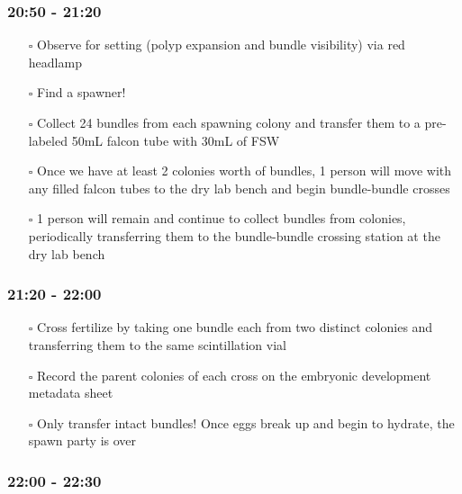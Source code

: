 \documentclass[
  letterpaper,
  DIV=11,
  numbers=noendperiod]{scrartcl}
\providecommand{\tightlist}{%
  \setlength{\itemsep}{0pt}\setlength{\parskip}{0pt}}\usepackage{longtable,booktabs,array}
\begin{document}
\hypertarget{section-2}{%
\subsubsection{20:50 - 21:20}\label{section-2}}

\begin{itemize}
\tightlist
\item[$\square$]
  Observe for setting (polyp expansion and bundle visibility) via red
  headlamp
\item[$\square$]
  Find a spawner!
\item[$\square$]
  Collect 24 bundles from each spawning colony and transfer them to a
  pre-labeled 50mL falcon tube with 30mL of FSW
\item[$\square$]
  Once we have at least 2 colonies worth of bundles, 1 person will move
  with any filled falcon tubes to the dry lab bench and begin
  bundle-bundle crosses
\item[$\square$]
  1 person will remain and continue to collect bundles from colonies,
  periodically transferring them to the bundle-bundle crossing station
  at the dry lab bench
\end{itemize}

\hypertarget{section-3}{%
\subsubsection{21:20 - 22:00}\label{section-3}}

\begin{itemize}
\tightlist
\item[$\square$]
  Cross fertilize by taking one bundle each from two distinct colonies
  and transferring them to the same scintillation vial
\item[$\square$]
  Record the parent colonies of each cross on the embryonic development
  metadata sheet
\item[$\square$]
  Only transfer intact bundles! Once eggs break up and begin to hydrate,
  the spawn party is over
\end{itemize}

\hypertarget{section-4}{%
\subsubsection{22:00 - 22:30}\label{section-4}}
\end{document}
